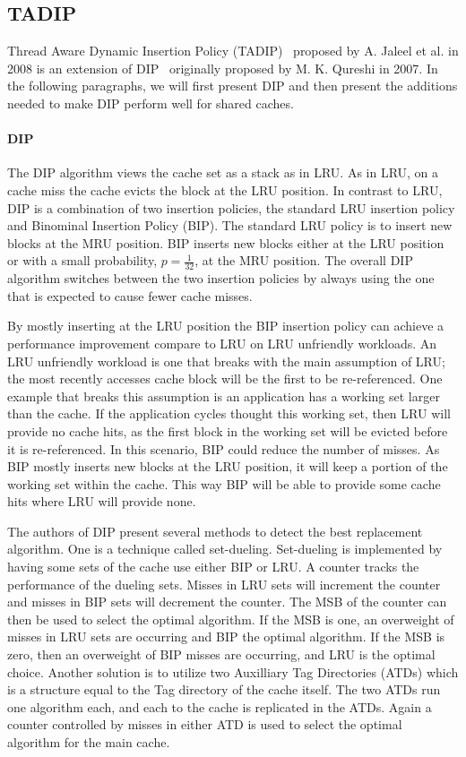\subsection{TADIP}
\label{sec:background:algorithms:tadip}

Thread Aware Dynamic Insertion Policy (TADIP)~\cite{Jaleel2008} proposed by A. Jaleel et al. in 2008 is an extension of DIP~\cite{Qureshi2007} originally proposed by M. K. Qureshi in 2007.
In the following paragraphs, we will first present DIP and then present the additions needed to make DIP perform well for shared caches.

\paragraph{DIP}

The DIP algorithm views the cache set as a stack as in LRU.
As in LRU, on a cache miss the cache evicts the block at the LRU position. 
In contrast to LRU, DIP is a combination of two insertion policies, the standard LRU insertion policy and Binominal Insertion Policy (BIP).
The standard LRU policy is to insert new blocks at the MRU position.
BIP inserts new blocks either at the LRU position or with a small probability, $p = \frac{1}{32}$, at the MRU position. The overall DIP algorithm switches between the two insertion policies by always using the one that is expected to cause fewer cache misses.

By mostly inserting at the LRU position the BIP insertion policy can achieve a performance improvement compare to LRU on LRU unfriendly workloads. 
An LRU unfriendly workload is one that breaks with the main assumption of LRU; the most recently accesses cache block will be the first to be re-referenced.
One example that breaks this assumption is an application has a working set larger than the cache. 
If the application cycles thought this working set, then LRU will provide no cache hits, as the first block in the working set will be evicted before it is re-referenced.
In this scenario, BIP could reduce the number of misses.
As BIP mostly inserts new blocks at the LRU position, it will keep a portion of the working set within the cache.
This way BIP will be able to provide some cache hits where LRU will provide none.

The authors of DIP present several methods to detect the best replacement algorithm. 
One is a technique called set-dueling.
Set-dueling is implemented by having some sets of the cache use either BIP or LRU. 
A counter tracks the performance of the dueling sets.
Misses in LRU sets will increment the counter and misses in BIP sets will decrement the counter.
The MSB of the counter can then be used to select the optimal algorithm.
If the MSB is one, an overweight of misses in LRU sets are occurring and BIP the optimal algorithm. 
If the MSB is zero, then an overweight of BIP misses are occurring, and LRU is the optimal choice.
Another solution is to utilize two Auxilliary Tag Directories (ATDs) which is a structure equal to the Tag directory of the cache itself.
The two ATDs run one algorithm each, and each to the cache is replicated in the ATDs.
Again a counter controlled by misses in either ATD is used to select the optimal algorithm for the main cache.

